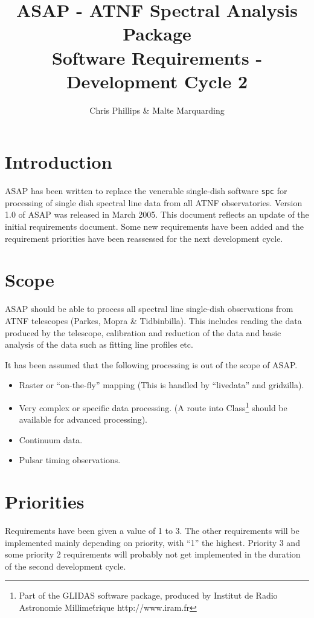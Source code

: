 \documentclass[11pt]{article}
\title{ASAP - ATNF Spectral Analysis Package\\
  Software Requirements - Development Cycle 2 }
\author{Chris Phillips \& Malte Marquarding}
\newcounter{requirement}
\let\oldsection\section
\renewcommand{\section}[1]{\setcounter{requirement}{0}\oldsection{#1}}
\begin{document}
\maketitle



\section{Introduction}

ASAP has been written to replace the venerable single-dish software
{\tt spc} for processing of single dish spectral line data from all
ATNF observatories. Version 1.0 of ASAP was released in March
2005. This document reflects an update of the initial requirements
document. Some new requirements have been added and the requirement
priorities have been reassessed for the next development cycle.

\section{Scope}

ASAP should be able to process all spectral line single-dish
observations from ATNF telescopes (Parkes, Mopra \& Tidbinbilla). This
includes reading the data produced by the telescope, calibration and
reduction of the data and basic analysis of the data such as fitting
line profiles etc.

It has been assumed that the following processing is out of the scope
of ASAP.
\begin{itemize}
\item Raster or ``on-the-fly'' mapping (This is handled by
``livedata'' and gridzilla).
\item Very complex or specific data processing. (A route into
  Class\footnote{Part of the GLIDAS software package, produced by
  Institut de Radio Astronomie Millime\'trique http://www.iram.fr}
  should be available for advanced processing).
\item Continuum data.
\item Pulsar timing observations.
\end{itemize}

\section{Priorities}

Requirements have been given a value of 1 to 3. The other requirements
will be implemented mainly depending on priority, with ``1'' the
highest. Priority 3 and some priority 2 requirements will probably not
get implemented in the duration of the second development cycle.
\end{document}
